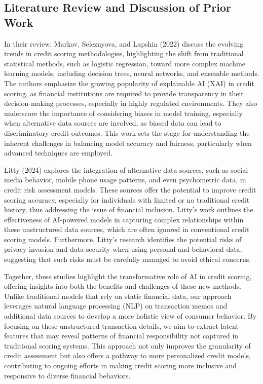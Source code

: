 \documentclass[12pt,letterpaper]{article}
\begin{document}
\subsection{Literature Review and Discussion of Prior Work}
    {In their review, Markov, Seleznyova, and Lapshin (2022) discuss the evolving trends in credit scoring methodologies, highlighting the shift from traditional statistical methods, such as logistic regression, toward more complex machine learning models, including decision trees, neural networks, and ensemble methods. The authors emphasize the growing popularity of explainable AI (XAI) in credit scoring, as financial institutions are required to provide transparency in their decision-making processes, especially in highly regulated environments. They also underscore the importance of considering biases in model training, especially when alternative data sources are involved, as biased data can lead to discriminatory credit outcomes. This work sets the stage for understanding the inherent challenges in balancing model accuracy and fairness, particularly when advanced techniques are employed.
        
    Litty (2024) explores the integration of alternative data sources, such as social media behavior, mobile phone usage patterns, and even psychometric data, in credit risk assessment models. These sources offer the potential to improve credit scoring accuracy, especially for individuals with limited or no traditional credit history, thus addressing the issue of financial inclusion. Litty’s work outlines the effectiveness of AI-powered models in capturing complex relationships within these unstructured data sources, which are often ignored in conventional credit scoring models. Furthermore, Litty’s research identifies the potential risks of privacy invasion and data security when using personal and behavioral data, suggesting that such risks must be carefully managed to avoid ethical concerns.
    
    Together, these studies highlight the transformative role of AI in credit scoring, offering insights into both the benefits and challenges of these new methods. Unlike traditional models that rely on static financial data, our approach leverages natural language processing (NLP) on transaction memos and additional data sources to develop a more holistic view of consumer behavior. By focusing on these unstructured transaction details, we aim to extract latent features that may reveal patterns of financial responsibility not captured in traditional scoring systems. This approach not only improves the granularity of credit assessment but also offers a pathway to more personalized credit models, contributing to ongoing efforts in making credit scoring more inclusive and responsive to diverse financial behaviors.
    }
    
\end{document}
